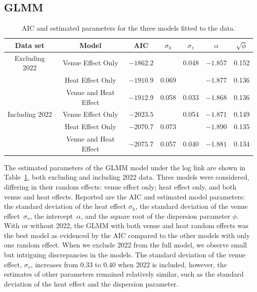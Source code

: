 \documentclass[12pt, letterpaper]{article}
\begin{document}
\subsection{GLMM} \label{subsec:Results_GLMM}

\begin{table}
  \centering
  \caption{AIC and estimated parameters for the three models fitted to the
    data.}
  \label{tab:Gamma_parameters}
  \begin{tabular}{c c c c c c c}
    \toprule
    Data set & Model & AIC & $\sigma_h$ & $\sigma_v$ & $\alpha$ & $\sqrt{\phi}$ \\
    \midrule
    Excluding 2022 &
      Venue Effect Only & $-1862.2$ &   & 0.048 & $-1.857$ & 0.152\\
     & Heat Effect Only & $-1910.9$ & 0.069 &  & $-1.877$ & 0.136\\
     & Venue and Heat Effect & $-1912.9$ & 0.058 & 0.033 & $-1.868$ & 0.136\\[1ex]
    Including 2022 &
    Venue Effect Only & $-2023.5$ &   & 0.054 & $-1.871$ & 0.149\\
    & Heat Effect Only & $-2070.7$ & 0.073 &  & $-1.890$ & 0.135\\
    & Venue and Heat Effect & $-2075.7$ & 0.057 & 0.040 & $-1.881$ & 0.134\\
    \bottomrule
  \end{tabular}
\end{table}


The estimated parameters of the GLMM model under the log link are shown in 
Table~\ref{tab:Gamma_parameters}, both excluding and including 2022 data.
Three models were considered, differing in their random effects: venue effect
only; heat effect only, and both venue and heat effects. Reported are the AIC
and estimated model parameters: the standard deviation
of the heat effect $\sigma_h$, the standard deviation of the venue
effect~$\sigma_v$, the intercept~$\alpha$, and the
square root of the dispersion parameter $\phi$. With or without 2022,
the GLMM with both venue and heat random effects was the best model as evidenced
by the AIC compared to the other models with only one random
effect.  When we exclude 2022 from the full model, we observe small but intriguing
discrepancies in the models. The standard deviation of the venue effect, 
$\sigma_v$, increases from 0.33 to 0.40 when 2022 is included, however, the
estimates of other parameters
remained relatively similar, such as the standard deviation of the heat effect
and the dispersion parameter.
\end{document}
